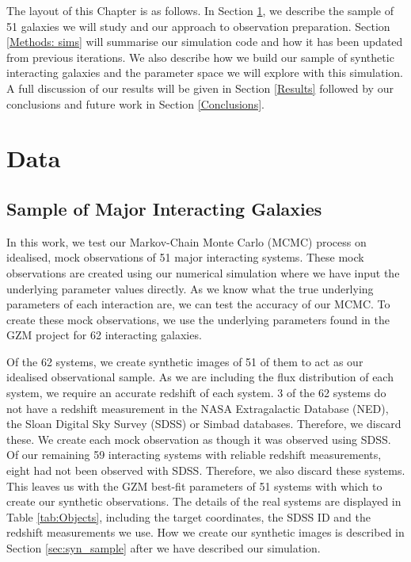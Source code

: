 The layout of this Chapter is as follows. In Section \ref{Data}, we describe the sample of 51 galaxies we will study and our approach to observation preparation. Section \ref{Methods: sims} will summarise our simulation code and how it has been updated from previous iterations. We also describe how we build our sample of synthetic interacting galaxies and the parameter space we will explore with this simulation. A full discussion of our results will be given in Section \ref{Results} followed by our conclusions and future work in Section \ref{Conclusions}.

\vspace{-5mm}
\section{Data}\label{Data}
\subsection{Sample of Major Interacting Galaxies}
\noindent In this work, we test our Markov-Chain Monte Carlo (MCMC) process on idealised, mock observations of 51 major interacting systems. These mock observations are created using our numerical simulation where we have input the underlying parameter values directly. As we know what the true underlying parameters of each interaction are, we can test the accuracy of our MCMC. To create these mock observations, we use the underlying parameters found in the GZM project for 62 interacting galaxies.

Of the 62 systems, we create synthetic images of 51 of them to act as our idealised observational sample. As we are including the flux distribution of each system, we require an accurate redshift of each system. 3 of the 62 systems do not have a redshift measurement in the NASA Extragalactic Database (NED), the Sloan Digital Sky Survey (SDSS) or Simbad databases. Therefore, we discard these. We create each mock observation as though it was observed using SDSS. Of our remaining 59 interacting systems with reliable redshift measurements, eight had not been observed with SDSS. Therefore, we also discard these systems. This leaves us with the GZM best-fit parameters of 51 systems with which to create our synthetic observations. The details of the real systems are displayed in Table \ref{tab:Objects}, including the target coordinates, the SDSS ID and the redshift measurements we use. How we create our synthetic images is described in Section \ref{sec:syn_sample} after we have described our simulation.

